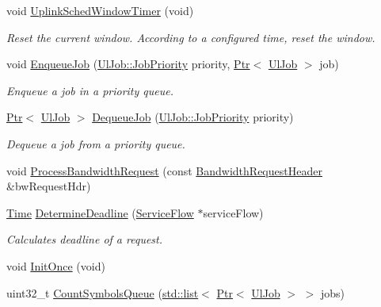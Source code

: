 \begin{DoxyCompactItemize}
void \hyperlink{classns3_1_1UplinkSchedulerMBQoS_a80733614c419c105ae666e830f1d5c1e}{Uplink\+Sched\+Window\+Timer} (void)
\begin{DoxyCompactList}\small\item\em Reset the current window. According to a configured time, reset the window. \end{DoxyCompactList}\item 
void \hyperlink{classns3_1_1UplinkSchedulerMBQoS_ad18bfc130fac723e65ada63fc3719b44}{Enqueue\+Job} (\hyperlink{classns3_1_1UlJob_a6ae1d8e2e490a32ee1bc8aae661f4983}{Ul\+Job\+::\+Job\+Priority} priority, \hyperlink{classns3_1_1Ptr}{Ptr}$<$ \hyperlink{classns3_1_1UlJob}{Ul\+Job} $>$ job)
\begin{DoxyCompactList}\small\item\em Enqueue a job in a priority queue. \end{DoxyCompactList}\item 
\hyperlink{classns3_1_1Ptr}{Ptr}$<$ \hyperlink{classns3_1_1UlJob}{Ul\+Job} $>$ \hyperlink{classns3_1_1UplinkSchedulerMBQoS_ab5438ccd3382992a8c91dda3b408b4d0}{Dequeue\+Job} (\hyperlink{classns3_1_1UlJob_a6ae1d8e2e490a32ee1bc8aae661f4983}{Ul\+Job\+::\+Job\+Priority} priority)
\begin{DoxyCompactList}\small\item\em Dequeue a job from a priority queue. \end{DoxyCompactList}\item 
void \hyperlink{classns3_1_1UplinkSchedulerMBQoS_a42c3d42e2972874f56b423b1c32e07b4}{Process\+Bandwidth\+Request} (const \hyperlink{classns3_1_1BandwidthRequestHeader}{Bandwidth\+Request\+Header} \&bw\+Request\+Hdr)
\item 
\hyperlink{classns3_1_1Time}{Time} \hyperlink{classns3_1_1UplinkSchedulerMBQoS_adadb381ed6d228290bae257e4344d84d}{Determine\+Deadline} (\hyperlink{classns3_1_1ServiceFlow}{Service\+Flow} $\ast$service\+Flow)
\begin{DoxyCompactList}\small\item\em Calculates deadline of a request. \end{DoxyCompactList}\item 
void \hyperlink{classns3_1_1UplinkSchedulerMBQoS_aa0ce923b356285a9e28d90b698d17557}{Init\+Once} (void)
\item 
uint32\+\_\+t \hyperlink{classns3_1_1UplinkSchedulerMBQoS_a31659c6f3996b4a820235a4359ab2a5e}{Count\+Symbols\+Queue} (\hyperlink{openflow-interface_8h_afd9bcfa176617760671b67580f536fa7}{std\+::list}$<$ \hyperlink{classns3_1_1Ptr}{Ptr}$<$ \hyperlink{classns3_1_1UlJob}{Ul\+Job} $>$ $>$ jobs)

\end{DoxyCompactItemize}
